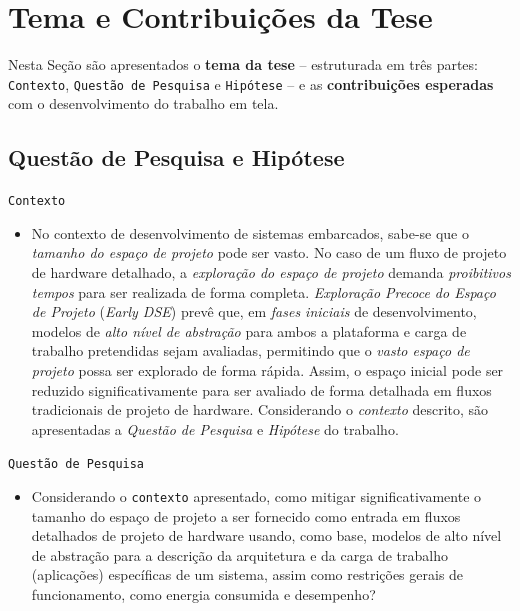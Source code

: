 \documentclass[tese-proposta,nocipinfo]{texufpel}
\begin{document}
\section{Tema e Contribuições  da Tese}
Nesta Seção são apresentados o \textbf{tema da tese} -- estruturada em três partes: \texttt{Contexto}, \texttt{Questão de Pesquisa} e \texttt{Hipótese} -- e as \textbf{contribuições esperadas} com o desenvolvimento do trabalho em tela.

\subsection{Questão de Pesquisa e Hipótese}

\texttt{Contexto}
\begin{itemize}
\item No contexto de desenvolvimento de sistemas embarcados, sabe-se que o \textit{tamanho do espaço de projeto} pode ser vasto. No caso de um fluxo de projeto de hardware detalhado, a \textit{exploração do espaço de projeto} demanda \textit{proibitivos tempos} para ser realizada de forma completa. \textit{Exploração Precoce do Espaço de Projeto} (\textit{Early DSE}) prevê que, em \textit{fases iniciais} de desenvolvimento, modelos de \textit{alto nível de abstração} para ambos a plataforma e carga de trabalho pretendidas sejam avaliadas, permitindo que o \textit{vasto espaço de projeto} possa ser explorado de forma rápida. Assim, o espaço inicial pode ser reduzido significativamente para ser avaliado de forma detalhada em fluxos tradicionais de projeto de hardware. Considerando o \textit{contexto} descrito, são apresentadas a \textit{Questão de Pesquisa} e \textit{Hipótese} do trabalho.
\end{itemize}

\texttt{Questão de Pesquisa}
\begin{itemize}
\item Considerando o \texttt{contexto} apresentado, como mitigar significativamente o tamanho do espaço de projeto a ser fornecido como entrada em fluxos detalhados de projeto de hardware usando, como base, modelos de alto nível de abstração para a descrição da arquitetura e da carga de trabalho (aplicações) específicas de um sistema, assim como restrições gerais de funcionamento, como energia consumida e desempenho?
\end{itemize}
\end{document}
